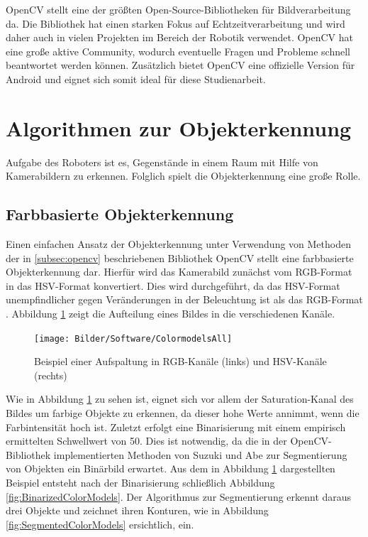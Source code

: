OpenCV \cite{opencv_library, bradski2008learning} stellt eine der größten Open-Source-Bibliotheken für Bildverarbeitung da. Die Bibliothek hat einen starken Fokus auf Echtzeitverarbeitung und wird daher auch in vielen Projekten im Bereich der Robotik verwendet. OpenCV hat eine große aktive Community, wodurch eventuelle Fragen und Probleme schnell beantwortet werden können. Zusätzlich bietet OpenCV eine offizielle Version für Android und eignet sich somit ideal für diese Studienarbeit.


\section{Algorithmen zur Objekterkennung}
\label{sec:Objekterkennung}

Aufgabe des Roboters ist es, Gegenstände in einem Raum mit Hilfe von Kamerabildern zu erkennen. Folglich spielt die Objekterkennung eine große Rolle.

\subsection{Farbbasierte Objekterkennung}
Einen einfachen Ansatz der Objekterkennung unter Verwendung von Methoden der in \ref{subsec:opencv} beschriebenen Bibliothek OpenCV stellt eine farbbasierte Objekterkennung dar. Hierfür wird das Kamerabild zunächst vom RGB-Format in das HSV-Format konvertiert. Dies wird durchgeführt, da das HSV-Format unempfindlicher gegen Veränderungen in der Beleuchtung ist als das RGB-Format \cite{cucchiara2001improving}. Abbildung \ref{fig:ColorModels} zeigt die Aufteilung eines Bildes in die verschiedenen Kanäle.

\begin{figure}[h]
\centering
\texttt{[image: Bilder/Software/ColormodelsAll]}
\caption{Beispiel einer Aufspaltung in RGB-Kanäle (links) und HSV-Kanäle (rechts)}
\label{fig:ColorModels}
\end{figure}

Wie in Abbildung \ref{fig:ColorModels} zu sehen ist, eignet sich vor allem der Saturation-Kanal des Bildes um farbige Objekte zu erkennen, da dieser hohe Werte annimmt, wenn die Farbintensität hoch ist. Zuletzt erfolgt eine Binarisierung mit einem empirisch ermittelten Schwellwert von 50. Dies ist notwendig, da die in der OpenCV-Bibliothek implementierten Methoden von Suzuki und Abe \cite{suzuki1985topological} zur Segmentierung von Objekten ein Binärbild erwartet. Aus dem in Abbildung \ref{fig:ColorModels} dargestellten Beispiel entsteht nach der Binarisierung schließlich Abbildung \ref{fig:BinarizedColorModels}. Der Algorithmus zur Segmentierung erkennt daraus drei Objekte und zeichnet ihren Konturen, wie in Abbildung \ref{fig:SegmentedColorModels} ersichtlich, ein.

